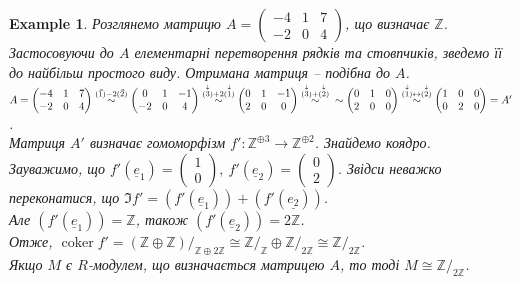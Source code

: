 \documentclass[a4paper, 10pt]{article}
\theoremstyle{theoremdd}
\theoremstyle{theoremdd}
\theoremstyle{theoremdd}
\theoremstyle{theoremdd}
\theoremstyle{theoremdd}
\newtheorem{example}[theorem]{Example}
\theoremstyle{theoremdd}
\theoremstyle{theoremdd}
\theoremstyle{theoremdd}
\theoremstyle{theoremdd}
\theoremstyle{theoremdd}
\theoremstyle{theoremdd}
\theoremstyle{theoremdd}
\theoremstyle{theoremdd}
\theoremstyle{theoremdd}
\theoremstyle{theoremdd}
\DeclareMathOperator{\coker}{coker}
\begin{document}
\begin{example}
Розглянемо матрицю $A = \begin{pmatrix}
-4 & 1 & 7 \\
-2 & 0 & 4
\end{pmatrix}$, що визначає $\mathbb{Z}$.\\
Застосовуючи до $A$ елементарні перетворення рядків та стовпчиків, зведемо її до найбільш простого виду. Отримана матриця -- подібна до $A$.\\
$A = \begin{pmatrix}
-4 & 1 & 7 \\
-2 & 0 & 4
\end{pmatrix} \overset{\substack{(\vec{1}) - 2 (\vec{2})}}{\sim} \begin{pmatrix}
0 & 1 & -1 \\
-2 & 0 & 4
\end{pmatrix} \overset{\substack{\overset{\downarrow}{(3)} + 2 \overset{\downarrow}{(1)}}}{\sim} \begin{pmatrix}
0 & 1 & -1 \\
2 & 0 & 0
\end{pmatrix} \overset{\substack{\overset{\downarrow}{(3)} + \overset{\downarrow}{(2)}}}{\sim} \\ \sim \begin{pmatrix}
0 & 1 & 0 \\
2 & 0 & 0
\end{pmatrix} \overset{\substack{\overset{\downarrow}{(1)} \leftrightarrow \overset{\downarrow}{(2)}}}{\sim} \begin{pmatrix}
1 & 0 & 0 \\
0 & 2 & 0
\end{pmatrix} = A'$.\\
Матриця $A'$ визначає гомоморфізм $f' \colon \mathbb{Z}^{\oplus 3} \to \mathbb{Z}^{\oplus 2}$. Знайдемо коядро.\\
Зауважимо, що $f'(\underline{e}_1) = \begin{pmatrix}
1 \\ 0
\end{pmatrix},\ f'(\underline{e}_2) = \begin{pmatrix}
0 \\ 2
\end{pmatrix}$. Звідси неважко переконатися, що $\Im f' = (f'(\underline{e}_1)) + (f'(\underline{e_2}))$.\\
Але $(f'(\underline{e}_1)) = \mathbb{Z}$, також $(f'(\underline{e}_2)) = 2\mathbb{Z}$.\\
Отже, $\coker f' = (\mathbb{Z} \oplus \mathbb{Z})/_{\mathbb{Z} \oplus 2 \mathbb{Z}} \cong \mathbb{Z}/_{\mathbb{Z}} \oplus \mathbb{Z}/_{2 \mathbb{Z}} \cong \mathbb{Z}/_{2 \mathbb{Z}}$.\\
Якщо $M$ є $R$-модулем, що визначається матрицею $A$, то тоді $M \cong \mathbb{Z}/_{2 \mathbb{Z}}$.
\end{example}
\end{document}
